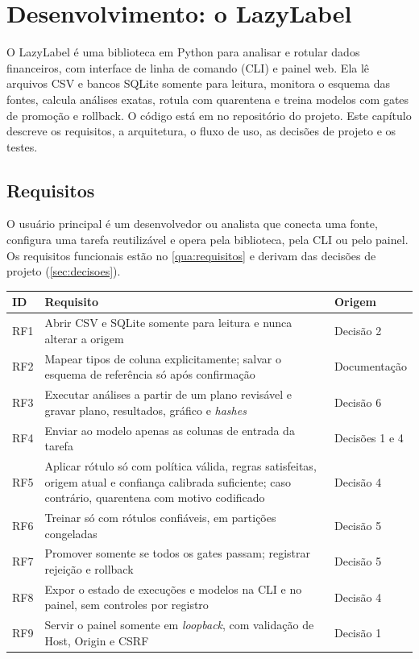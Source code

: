 \chapter{Desenvolvimento: o LazyLabel}
\label{cap:desenvolvimento}

O LazyLabel é uma biblioteca em Python para analisar e rotular dados financeiros, com interface de linha de comando (CLI) e painel web. Ela lê arquivos CSV e bancos SQLite somente para leitura, monitora o esquema das fontes, calcula análises exatas, rotula com quarentena e treina modelos com gates de promoção e rollback. O código está em  no repositório do projeto. Este capítulo descreve os requisitos, a arquitetura, o fluxo de uso, as decisões de projeto e os testes.

\section{Requisitos}

O usuário principal é um desenvolvedor ou analista que conecta uma fonte, configura uma tarefa reutilizável e opera pela biblioteca, pela CLI ou pelo painel. Os requisitos funcionais estão no \autoref{qua:requisitos} e derivam das decisões de projeto (\autoref{sec:decisoes}).

\begin{quadro}[htb]
  \caption{Requisitos funcionais do LazyLabel}
  \label{qua:requisitos}
  \small
  \begin{tabularx}{\textwidth}{|l|X|l|}
    \hline
    \textbf{ID} & \textbf{Requisito} & \textbf{Origem} \\ \hline
    RF1 & Abrir CSV e SQLite somente para leitura e nunca alterar a origem & Decisão 2 \\ \hline
    RF2 & Mapear tipos de coluna explicitamente; salvar o esquema de referência só após confirmação & Documentação \\ \hline
    RF3 & Executar análises a partir de um plano revisável e gravar plano, resultados, gráfico e \emph{hashes} & Decisão 6 \\ \hline
    RF4 & Enviar ao modelo apenas as colunas de entrada da tarefa & Decisões 1 e 4 \\ \hline
    RF5 & Aplicar rótulo só com política válida, regras satisfeitas, origem atual e confiança calibrada suficiente; caso contrário, quarentena com motivo codificado & Decisão 4 \\ \hline
    RF6 & Treinar só com rótulos confiáveis, em partições congeladas & Decisão 5 \\ \hline
    RF7 & Promover somente se todos os gates passam; registrar rejeição e rollback & Decisão 5 \\ \hline
    RF8 & Expor o estado de execuções e modelos na CLI e no painel, sem controles por registro & Decisão 4 \\ \hline
    RF9 & Servir o painel somente em \emph{loopback}, com validação de Host, Origin e CSRF & Decisão 1 \\ \hline
  \end{tabularx}
\end{quadro}

